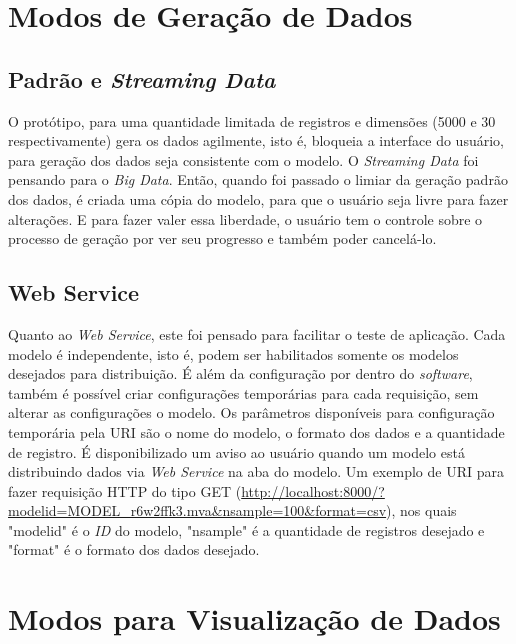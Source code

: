 \documentclass[
	12pt,				%
	openright,			%
	twoside,			%
	a4paper,			%
	english,			%
	brazil				%
	]{abntex2}
\begin{document}
	\section{Modos de Geração de Dados}

		\subsection{Padrão e \emph{Streaming Data}}
		O protótipo, para uma quantidade limitada de registros e dimensões (5000 e 30 respectivamente) gera os dados agilmente, isto é, bloqueia a interface do usuário, para geração dos dados seja consistente com o modelo.
		O \emph{Streaming Data} foi pensando para o \emph{Big Data}. Então, quando foi passado o limiar da geração padrão dos dados, é criada uma cópia do modelo, para que o usuário seja livre para fazer alterações.
		E para fazer valer essa liberdade, o usuário tem o controle sobre o processo de geração por ver seu progresso e também poder cancelá-lo.
		\subsection{Web Service}
		Quanto ao \emph{Web Service}, este foi pensado para facilitar o teste de aplicação.
		Cada modelo é independente, isto é, podem ser habilitados somente os modelos desejados para distribuição.
		É além da configuração por dentro do \emph{software}, também é possível criar configurações temporárias para cada requisição, sem alterar as configurações o modelo.
		Os parâmetros disponíveis para configuração temporária pela URI são o nome do modelo, o formato dos dados e a quantidade de registro.
		É disponibilizado um aviso ao usuário quando um modelo está distribuindo dados via \emph{Web Service} na aba do modelo.
		Um exemplo de URI para fazer requisição HTTP do tipo GET (\url{http://localhost:8000/?modelid=MODEL_r6w2ffk3.mva&nsample=100&format=csv}), nos quais "modelid" é o \emph{ID} do modelo, "nsample" é a quantidade de registros desejado e "format" é o formato dos dados desejado.
	 
	\section{Modos para Visualização de Dados}
\end{document}
